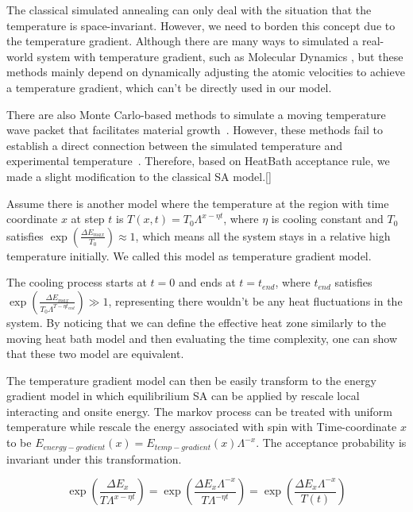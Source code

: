 \documentclass[twocolumn,superscriptaddress,english,showpacs,longbibliography]{revtex4-2}
\newcommand{\jinguo}[1]{[{\color{blue}{JGL: #1}}]}
\begin{document}
The classical simulated annealing can only deal with the situation that
the temperature is space-invariant. However, we need to borden this concept
due to the temperature gradient. Although there are many ways to
simulated a real-world system with temperature gradient, such as
Molecular Dynamics \cite{Bai2015, Deng2006}, but
these methods mainly depend on dynamically adjusting the atomic
velocities to achieve a temperature gradient, which can't be directly
used in our model.

There are also Monte Carlo-based methods to simulate a moving
temperature wave packet that facilitates material growth~\cite{Godfrey1995, Tan2017}.
However, these methods fail to establish a direct connection between the simulated temperature and experimental
temperature~\cite{Zollner2014}.
Therefore, based on HeatBath acceptance rule, we made a slight modification to the classical SA model.\jinguo{??? shouldn't it be Glauber dynamics?}


Assume there is another model where the temperature at the region with 
time coordinate $x$ at step $t$ is $T(x, t) = T_0\Lambda^{x - \eta t}$, where 
$\eta$ is cooling constant and $T_0$ satisfies $\exp(\frac{\Delta E_{max}}{T_0})\approx 1$, 
which means all the system stays in a relative high temperature initially. 
We called this model as temperature gradient model.

The cooling process starts at $t=0$ and ends at $t=t_{end}$, where $t_{end}$ satisfies
$\exp(\frac{\Delta E_{max}}{T_0\Lambda^{T - \eta t_{end}}}) \gg 1$, representing there wouldn't be any heat
fluctuations in the system. By noticing that we can define the effective heat zone
similarly to the moving heat bath model and then evaluating the time complexity, one can show that these two model are
equivalent.

The temperature gradient model can then be easily transform to
the energy gradient model in which equilibrilium SA can be applied by rescale local interacting and onsite energy.
The markov process can be treated with uniform temperature while rescale the energy associated with spin with Time-coordinate $x$
to be $E_{energy-gradient}(x) = E_{temp-gradient}(x)\Lambda^{-x}$. The acceptance probability is
invariant under this transformation.

\begin{equation}
    \exp\left({\frac{\Delta E_x}{T\Lambda^{x-\eta t}}}\right) = \exp\left({\frac{\Delta E_x\Lambda^{-x}}{T\Lambda^{-\eta t}}}\right) = \exp\left({\frac{\Delta E_x \Lambda^{-x}}{T(t)}}\right)
\end{equation}
\end{document}
